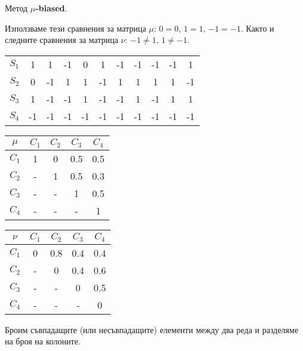 \documentclass{beamer}
\begin{document}
\begin{frame}
Метод \textbf{$\mu$-biased}.

\bigskip
Използваме тези сравнения за матрица $\mu$: $0=0$, $1=1$, $-1=-1$.
Както и следните сравнения за матрица $\nu$: $-1\neq1$, $1\neq-1$.

\begin{center}
\begin{tabular}{c|cccccccccc}
& & & & & & & & & & \\
\hline $S_1$ & 1 & 1 & -1 & 0 & 1 & -1 & -1 & -1 & -1 & 1 \\
$S_2$ & 0 & -1 & 1 & 1 & -1 & 1 & 1 & 1 & 1 & -1 \\
$S_3$ & 1 & -1 & -1 & 1 & -1 & -1 & 1 & -1 & 1 & 1 \\
$S_4$ & -1 & -1 & -1 & -1 & -1 & -1 & -1 & -1 & -1 & -1
\end{tabular}
\end{center}

\begin{center}
\begin{minipage}[b]{0.4\linewidth}
\begin{tabular}{c|cccc}
$\mu$ & $C_1$ & $C_2$ & $C_3$ & $C_4$ \\
\hline $C_1$ & 1 & 0 & 0.5 & 0.5 \\
$C_2$ & - & 1 & 0.5 & 0.3 \\
$C_3$ & - & - & 1 & 0.5 \\
$C_4$ & - & - & - & 1
\end{tabular}
\end{minipage}
\begin{minipage}[b]{0.4\linewidth}
\begin{tabular}{c|cccc}
$\nu$ & $C_1$ & $C_2$ & $C_3$ & $C_4$ \\
\hline $C_1$ & 0 & 0.8 & 0.4 & 0.4 \\
$C_2$ & - & 0 & 0.4 & 0.6 \\
$C_3$ & - & - & 0 & 0.5 \\
$C_4$ & - & - & - & 0
\end{tabular}
\end{minipage}
\end{center}

Броим съвпадащите (или несъвпадащите) елементи между два реда и разделяме на броя на колоните.
\end{frame}
\end{document}
